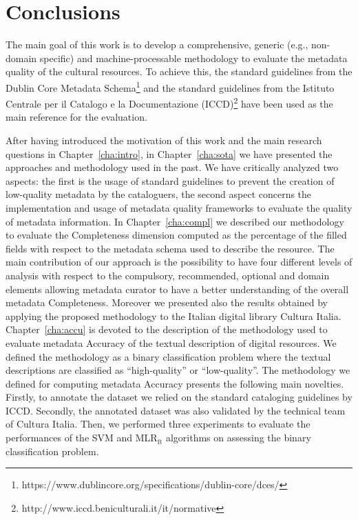 \documentclass[epsfig,a4paper,12pt,titlepage]{book}
\newcommand{\mlr}{MLR$_\text{ft}$\xspace}
\begin{document}
\chapter{Conclusions}
\label{cha:conclusion}

The main goal of this work is to develop a comprehensive, generic (e.g., non-domain specific) and machine-processable methodology to evaluate the metadata quality of the cultural resources. To achieve this, the standard guidelines from the Dublin Core Metadata Schema\footnote{https://www.dublincore.org/specifications/dublin-core/dces/} and the standard guidelines from the Istituto Centrale per il Catalogo e la Documentazione (ICCD)\footnote{http://www.iccd.beniculturali.it/it/normative} have been used as the main reference for the evaluation.


After having introduced the motivation of this work and the main research questions in Chapter~\ref{cha:intro}, in Chapter~\ref{cha:sota} we have presented the approaches and methodology used in the past. We have critically analyzed two aspects: the first is the usage of standard guidelines  to prevent the creation of low-quality metadata by the cataloguers, the second aspect concerns the implementation and usage of metadata quality frameworks to evaluate the quality of metadata information. In Chapter~\ref{cha:compl} we described our methodology to evaluate the Completeness dimension computed as the percentage of the filled fields with respect to the metadata schema used to describe the resource. The main contribution of our approach is the possibility to have four different levels of analysis with respect to the compulsory, recommended, optional and domain elements allowing metadata curator to have a better understanding of the overall metadata Completeness. Moreover we presented also the results obtained by applying the proposed methodology to the Italian digital library Cultura Italia. Chapter~\ref{cha:accu} is devoted to the description of the methodology used to evaluate metadata Accuracy of the textual description of digital resources. We defined the methodology as a binary classification problem where the textual descriptions are classified as ``high-quality'' or ``low-quality''. The methodology we defined for computing metadata Accuracy presents the following main novelties. Firstly, to annotate the dataset we relied on the standard cataloging guidelines by ICCD. Secondly, the annotated dataset was also validated by the technical team of Cultura Italia. Then, we performed three experiments to evaluate the performances of the SVM and \mlr algorithms on assessing the binary classification problem.   
\end{document}
